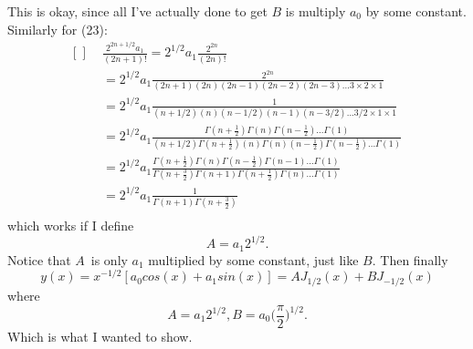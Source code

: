 \documentclass[a4paper,12pt]{article}
\begin{document}
This is okay, since all I've actually done to get $B$ is multiply $a_0$ by some constant.
Similarly for (23):
\begin{equation*}
\begin{aligned}[\left]
&\frac{2^{2n+1/2}a_1}{(2n+1)!} = 2^{1/2}a_1 \frac{2^{2n}}{(2n)!}\\
&= 2^{1/2}a_1 \frac{2^{2n}}{(2n+1)(2n)(2n-1)(2n-2)(2n-3)...3\times 2\times 1}\\
&= 2^{1/2}a_1 \frac{1}{(n+1/2)(n)(n-1/2)(n-1)(n-3/2)...3/2\times 1\times 1}\\
&= 2^{1/2}a_1 \frac{\Gamma(n+\frac{1}{2})\Gamma(n)\Gamma(n-\frac{1}{2})...\Gamma(1)} {(n+1/2)\Gamma(n+\frac{1}{2})(n)\Gamma(n)(n-\frac{1}{2})\Gamma(n-\frac{1}{2})...\Gamma(1)}\\
&= 2^{1/2}a_1 \frac{\Gamma(n+\frac{1}{2})\Gamma(n)\Gamma(n-\frac{1}{2})\Gamma(n-1)...\Gamma(1)} {\Gamma(n+\frac{3}{2})\Gamma(n+1)\Gamma(n+\frac{1}{2})\Gamma(n)...\Gamma(1)}\\
&= 2^{1/2}a_1 \frac{1} {\Gamma(n+1)\Gamma(n+\frac{3}{2})}\\
\end{aligned}
\end{equation*}
which works if I define 
\begin{equation}
A = a_1 2^{1/2}.
\end{equation}
Notice that $A$ is only $a_1$ multiplied by some constant, just like $B$.
Then finally 
\begin{equation}
y(x) = x^{-1/2}[a_0 cos(x) + a_1 sin(x)] = AJ_{1/2}(x) + BJ_{-1/2}(x)
\end{equation}
where 
\begin{equation*}
A = a_1 2^{1/2} , B = a_0\bigg(\frac{\pi}{2}\bigg)^{1/2}.
\end{equation*}
Which is what I wanted to show.
\end{document}
